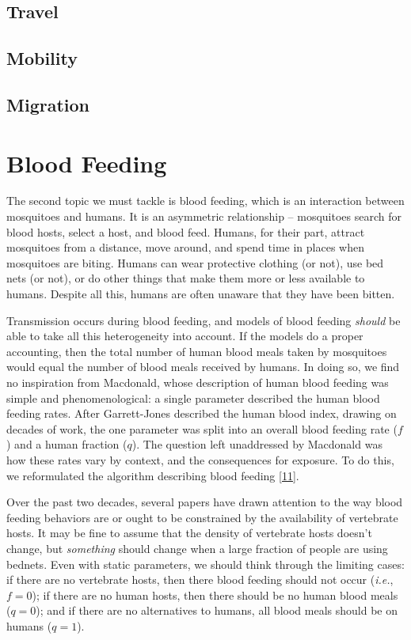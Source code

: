 \documentclass[
]{book}
\begin{document}
\hypertarget{travel}{%
\subsection{Travel}\label{travel}}

\hypertarget{mobility}{%
\subsection{Mobility}\label{mobility}}

\hypertarget{migration}{%
\subsection{Migration}\label{migration}}

\hypertarget{blood-feeding}{%
\section{Blood Feeding}\label{blood-feeding}}

The second topic we must tackle is blood feeding, which is an interaction between mosquitoes and humans. It is an asymmetric relationship -- mosquitoes search for blood hosts, select a host, and blood feed. Humans, for their part, attract mosquitoes from a distance, move around, and spend time in places when mosquitoes are biting. Humans can wear protective clothing (or not), use bed nets (or not), or do other things that make them more or less available to humans. Despite all this, humans are often unaware that they have been bitten.

Transmission occurs during blood feeding, and models of blood feeding \emph{should} be able to take all this heterogeneity into account. If the models do a proper accounting, then the total number of human blood meals taken by mosquitoes would equal the number of blood meals received by humans. In doing so, we find no inspiration from Macdonald, whose description of human blood feeding was simple and phenomenological: a single parameter described the human blood feeding rates. After Garrett-Jones described the human blood index, drawing on decades of work, the one parameter was split into an overall blood feeding rate (\(f\)) and a human fraction (\(q\)). The question left unaddressed by Macdonald was how these rates vary by context, and the consequences for exposure. To do this, we reformulated the algorithm describing blood feeding {[}\protect\hyperlink{ref-WuSL2023SpatialDynamics}{11}{]}.

Over the past two decades, several papers have drawn attention to the way blood feeding behaviors are or ought to be constrained by the availability of vertebrate hosts. It may be fine to assume that the density of vertebrate hosts doesn't change, but \emph{something} should change when a large fraction of people are using bednets. Even with static parameters, we should think through the limiting cases: if there are no vertebrate hosts, then there blood feeding should not occur (\emph{i.e.}, \(f=0\)); if there are no human hosts, then there should be no human blood meals (\(q=0\)); and if there are no alternatives to humans, all blood meals should be on humans (\(q=1\)).
\end{document}
